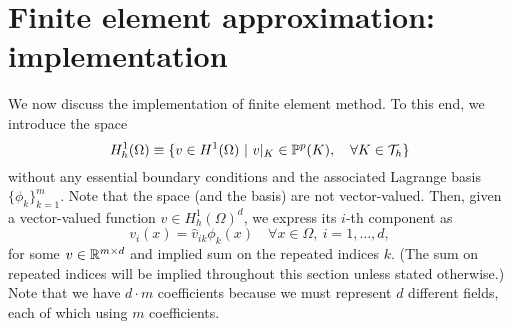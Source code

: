 \section{Finite element approximation: implementation}
We now discuss the implementation of finite element method. To this end, we introduce the space
\begin{equation*}
  H^1_h(\Omega) \equiv \{ v \in H^1(\Omega) \ | \ v|_K \in \mathbb{P}^p(K) , \quad \forall K \in \mathcal{T}_h \} 
\end{equation*}
without any essential boundary conditions and the associated Lagrange basis $\{ \phi_k \}_{k=1}^m$.  Note that the space (and the basis) are not vector-valued. Then, given a vector-valued function $v \in H^1_h(\Omega)^d$, we express its $i$-th component as
\begin{equation*}
  v_i(x) = \hat v_{ik} \phi_k(x) \quad \forall x \in \Omega, \ i = 1,\dots, d,
\end{equation*}
for some $v \in \mathbb{R}^{m \times d}$ and implied sum on the repeated indices $k$. (The sum on repeated indices will be implied throughout this section unless stated otherwise.)  Note that we have $d\cdot m$ coefficients because we must represent $d$ different fields, each of which using $m$ coefficients.

